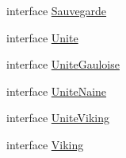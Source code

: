 \begin{DoxyCompactItemize}
\item 
interface \hyperlink{interface_code___small_world_1_1_sauvegarde}{Sauvegarde}
\item 
interface \hyperlink{interface_code___small_world_1_1_unite}{Unite}
\item 
interface \hyperlink{interface_code___small_world_1_1_unite_gauloise}{Unite\-Gauloise}
\item 
interface \hyperlink{interface_code___small_world_1_1_unite_naine}{Unite\-Naine}
\item 
interface \hyperlink{interface_code___small_world_1_1_unite_viking}{Unite\-Viking}
\item 
interface \hyperlink{interface_code___small_world_1_1_viking}{Viking}
\end{DoxyCompactItemize}
